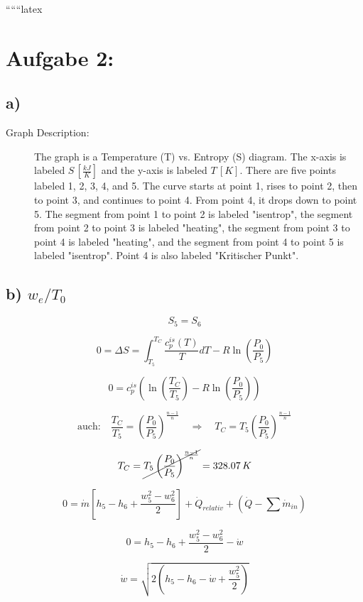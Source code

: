 
``````latex


\section*{Aufgabe 2:}

\subsection*{a)}

\begin{description}
    \item[Graph Description:] The graph is a Temperature (T) vs. Entropy (S) diagram. The x-axis is labeled \( S \, [\frac{kJ}{K}] \) and the y-axis is labeled \( T \, [K] \). There are five points labeled 1, 2, 3, 4, and 5. The curve starts at point 1, rises to point 2, then to point 3, and continues to point 4. From point 4, it drops down to point 5. The segment from point 1 to point 2 is labeled "isentrop", the segment from point 2 to point 3 is labeled "heating", the segment from point 3 to point 4 is labeled "heating", and the segment from point 4 to point 5 is labeled "isentrop". Point 4 is also labeled "Kritischer Punkt".
\end{description}

\subsection*{b) \( w_e / T_0 \)}

\[
S_5 = S_6
\]

\[
0 = \Delta S = \int_{T_5}^{T_C} \frac{c_p^{is}(T)}{T} dT - R \ln \left( \frac{P_0}{P_5} \right)
\]

\[
0 = c_p^{is} \left( \ln \left( \frac{T_C}{T_5} \right) - R \ln \left( \frac{P_0}{P_5} \right) \right)
\]

\[
\text{auch:} \quad \frac{T_C}{T_5} = \left( \frac{P_0}{P_5} \right)^{\frac{n-1}{n}} \quad \Rightarrow \quad T_C = T_5 \left( \frac{P_0}{P_5} \right)^{\frac{n-1}{n}}
\]

\[
T_C = \cancel{T_5 \left( \frac{P_0}{P_5} \right)^{\frac{n-1}{n}}} = 328.07 \, K
\]

\[
0 = \dot{m} \left[ h_5 - h_6 + \frac{w_5^2 - w_6^2}{2} \right] + \dot{Q}_{relativ} + \left( \dot{Q} - \sum \dot{m}_{in} \right)
\]

\[
0 = h_5 - h_6 + \frac{w_5^2 - w_6^2}{2} - \dot{w}
\]

\[
\dot{w} = \sqrt{2 \left( h_5 - h_6 - \dot{w} + \frac{w_5^2}{2} \right)}
\]

